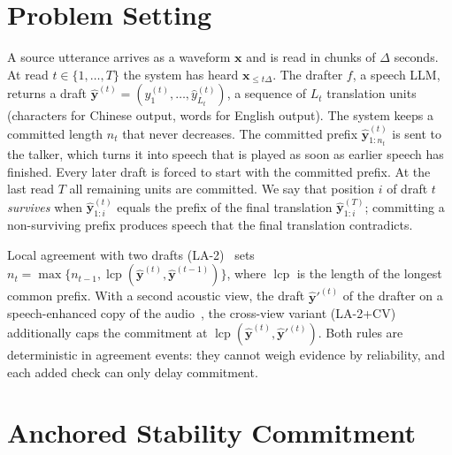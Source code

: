 \section{Problem Setting}
\label{sec:setting}

A source utterance arrives as a waveform $\bm{x}$ and is read in chunks of $\Delta$ seconds.
At read $t \in \{1,\dots,T\}$ the system has heard $\bm{x}_{\le t\Delta}$.
The drafter $f$, a speech LLM, returns a draft $\hat{\bm{y}}^{(t)} = (\hat{y}^{(t)}_1,\dots,\hat{y}^{(t)}_{L_t})$, a sequence of $L_t$ translation units (characters for Chinese output, words for English output).
The system keeps a committed length $n_t$ that never decreases.
The committed prefix $\hat{\bm{y}}^{(t)}_{1:n_t}$ is sent to the talker, which turns it into speech that is played as soon as earlier speech has finished.
Every later draft is forced to start with the committed prefix.
At the last read $T$ all remaining units are committed.
We say that position $i$ of draft $t$ \emph{survives} when $\hat{\bm{y}}^{(t)}_{1:i}$ equals the prefix of the final translation $\hat{\bm{y}}^{(T)}_{1:i}$; committing a non-surviving prefix produces speech that the final translation contradicts.

Local agreement with two drafts (LA-2)~\citep{liu2020low,polak2022cuni} sets
$n_t = \max\{n_{t-1}, \operatorname{lcp}(\hat{\bm{y}}^{(t)}, \hat{\bm{y}}^{(t-1)})\}$, where $\operatorname{lcp}$ is the length of the longest common prefix.
With a second acoustic view, the draft $\hat{\bm{y}}'^{(t)}$ of the drafter on a speech-enhanced copy of the audio~\citep{schroeter2023deepfilternet}, the cross-view variant (LA-2+CV) additionally caps the commitment at $\operatorname{lcp}(\hat{\bm{y}}^{(t)}, \hat{\bm{y}}'^{(t)})$.
Both rules are deterministic in agreement events: they cannot weigh evidence by reliability, and each added check can only delay commitment.

\section{Anchored Stability Commitment}
\label{sec:method}

